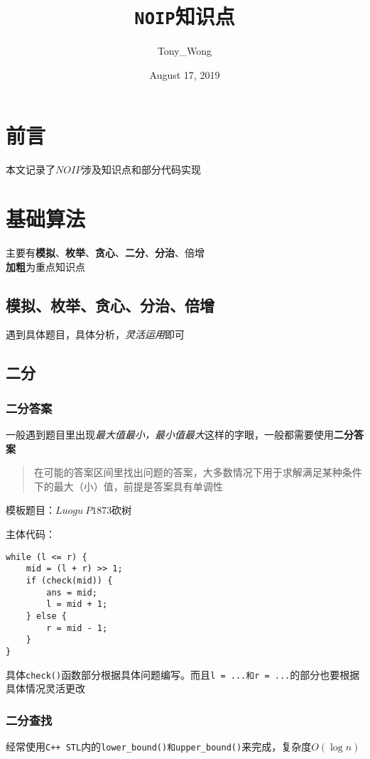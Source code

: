 \documentclass[UTF8]{ctexart}
\author{Tony\_Wong}
\date{August 17, 2019}
\title{\huge \texttt{NOIP}知识点}
\begin{document}
\maketitle


\section{前言}
本文记录了$NOIP$涉及知识点和部分代码实现

\section{基础算法}
主要有\textbf{模拟}、\textbf{枚举}、\textbf{贪心}、\textbf{二分}、\textbf{分治}、倍增\\
\textbf{加粗}为重点知识点

\subsection{模拟、枚举、贪心、分治、倍增}
遇到具体题目，具体分析，\emph{灵活运用}即可

\subsection{二分}
\subsubsection{二分答案}
一般遇到题目里出现\emph{最大值最小，最小值最大}这样的字眼，一般都需要使用\textbf{二分答案}\\

\begin{quote}
	在可能的答案区间里找出问题的答案，大多数情况下用于求解满足某种条件下的最大（小）值，前提是答案具有单调性
\end{quote}

模板题目：$Luogu\ P1873$砍树

主体代码：\\
\begin{lstlisting}
while (l <= r) {
    mid = (l + r) >> 1;
    if (check(mid)) {
        ans = mid;
        l = mid + 1;
    } else {
        r = mid - 1;
    }
}
\end{lstlisting}

具体\texttt{check()}函数部分根据具体问题编写。而且\texttt{l = ...和r = ...}的部分也要根据具体情况灵活更改

\subsubsection{二分查找}
经常使用\texttt{C++\ STL}内的\texttt{lower\_bound()和upper\_bound()}来完成，复杂度$O(\log n)$
\end{document}
